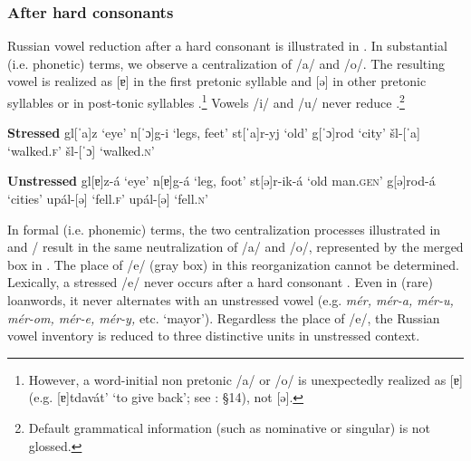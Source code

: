 \documentclass[output=paper,
modfonts,
newtxmath,
hidelinks,
]{langscibook}
\begin{document}
\subsubsection{After hard consonants}\label{s2.1.1}

Russian vowel reduction after a hard consonant is illustrated in . In substantial (i.e. phonetic) terms, we observe a centralization of /a/ and /o/. The resulting vowel is realized as [ɐ] in the first pretonic syllable  and [ə] in other pretonic syllables  or in post-tonic syllables .\footnote{However, a word-initial non pretonic /a/ or /o/ is unexpectedly realized as [ɐ] (e.g. [ɐ]tdavát’ ‘to give back’; see \citealt{Avanesov1968}: §14), not [ə].} Vowels /i/ and /u/ never reduce \citep[38--42]{Avanesov1968}.\footnote{Default grammatical information (such as nominative or singular) is not glossed.}\vspace{-\baselineskip}

\ea\label{3}\begin{multicols}{2}
\begin{xlist}
\exi{} \textbf{Stressed}
\ex gl[ˈa]z \tabto{2.1cm}‘eye’\label{3a}
\exi{} n[ˈɔ]g-i \tabto{2.1cm}‘legs, feet’
\ex st[ˈa]r-yj \tabto{2.1cm}‘old’\label{3b}
\exi{} g[ˈɔ]rod \tabto{2.1cm}‘city’
\ex šl-[ˈa] \tabto{2.1cm}‘walked.\textsc{f}’\label{3c}
\exi{} šl-[ˈɔ] \tabto{2.1cm}‘walked.\textsc{n}’
\end{xlist}\columnbreak
\begin{xlist}
\exi{} \textbf{Unstressed}
\exi{} gl[ɐ]z-á \tabto{2.1cm}‘eye’
\exi{} n[ɐ]g-á \tabto{2.1cm}‘leg, foot’
\exi{} st[ə]r-ik-á \tabto{2.1cm}‘old man.\textsc{gen}’
\exi{} g[ə]rod-á \tabto{2.1cm}‘cities’
\exi{} upál-[ə] \tabto{2.1cm}‘fell.\textsc{f}’ 
\exi{} upál-[ə] \tabto{2.1cm}‘fell.\textsc{n}’
\end{xlist}
\end{multicols}
\z

In formal (i.e. phonemic) terms, the two centralization processes illustrated in  and / result in the same neutralization of /a/ and /o/, represented by the merged box in . The place of /e/ (gray box) in this reorganization cannot be determined. Lexically, a stressed /e/ never occurs after a hard consonant \citep[§103]{Garde1998}. Even in (rare) loanwords, it never alternates with an unstressed vowel (e.g. \textit{mér, mér-a, mér-u, mér-om, mér-e, mér-y,} etc. ‘mayor’). Regardless the place of /e/, the Russian vowel inventory is reduced to three distinctive units in unstressed context.\largerpage[-2]
\end{document}
